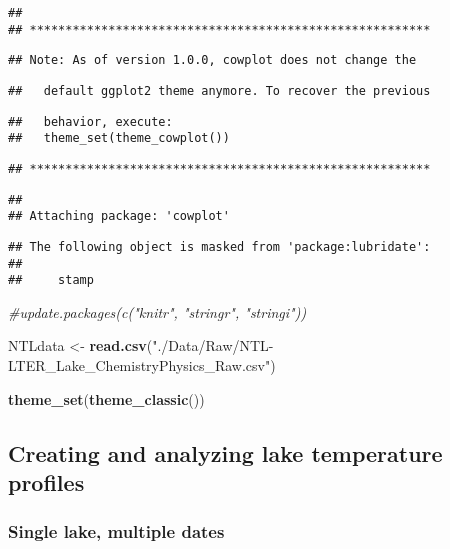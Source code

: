 \documentclass[]{article}
\newenvironment{Shaded}{\begin{snugshade}}{\end{snugshade}}
\newcommand{\CommentTok}[1]{\textcolor[rgb]{0.56,0.35,0.01}{\textit{#1}}}
\newcommand{\KeywordTok}[1]{\textcolor[rgb]{0.13,0.29,0.53}{\textbf{#1}}}
\newcommand{\NormalTok}[1]{#1}
\newcommand{\StringTok}[1]{\textcolor[rgb]{0.31,0.60,0.02}{#1}}
\begin{document}
\begin{verbatim}
## 
## ********************************************************
\end{verbatim}

\begin{verbatim}
## Note: As of version 1.0.0, cowplot does not change the
\end{verbatim}

\begin{verbatim}
##   default ggplot2 theme anymore. To recover the previous
\end{verbatim}

\begin{verbatim}
##   behavior, execute:
##   theme_set(theme_cowplot())
\end{verbatim}

\begin{verbatim}
## ********************************************************
\end{verbatim}

\begin{verbatim}
## 
## Attaching package: 'cowplot'
\end{verbatim}

\begin{verbatim}
## The following object is masked from 'package:lubridate':
## 
##     stamp
\end{verbatim}

\begin{Shaded}
\begin{Highlighting}[]
\CommentTok{#update.packages(c("knitr", "stringr", "stringi"))}

\NormalTok{NTLdata <-}\StringTok{ }\KeywordTok{read.csv}\NormalTok{(}\StringTok{"./Data/Raw/NTL-LTER_Lake_ChemistryPhysics_Raw.csv"}\NormalTok{)}

\KeywordTok{theme_set}\NormalTok{(}\KeywordTok{theme_classic}\NormalTok{())}
\end{Highlighting}
\end{Shaded}

\hypertarget{creating-and-analyzing-lake-temperature-profiles}{%
\subsection{Creating and analyzing lake temperature
profiles}\label{creating-and-analyzing-lake-temperature-profiles}}

\hypertarget{single-lake-multiple-dates}{%
\subsubsection{Single lake, multiple
dates}\label{single-lake-multiple-dates}}
\end{document}
